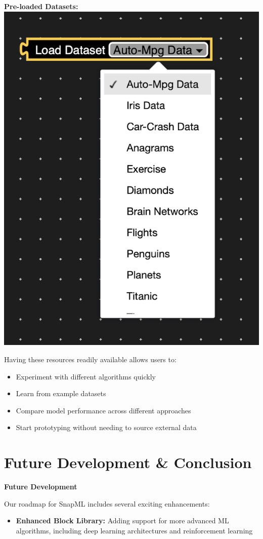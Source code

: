 \documentclass[a0paper,portrait]{article}
\newcommand{\compresslist}{%
\setlength{\itemsep}{0pt}%
\setlength{\parskip}{0pt}%
\setlength{\parsep}{0pt}%
}
\begin{document}
\begin{multicols}{2}
\begin{center}
\textbf{Pre-loaded Datasets:}
\includegraphics[width=0.7\linewidth]{目前已有的dataset.png}
\end{center}

Having these resources readily available allows users to:
\begin{itemize}\compresslist
    \item Experiment with different algorithms quickly
    \item Learn from example datasets
    \item Compare model performance across different approaches
    \item Start prototyping without needing to source external data
\end{itemize}

\section{Future Development \& Conclusion}

\textbf{Future Development}

Our roadmap for SnapML includes several exciting enhancements:

\begin{itemize}\compresslist
    \item \textbf{Enhanced Block Library:} Adding support for more advanced ML algorithms, including deep learning architectures and reinforcement learning
    

\end{itemize}
\end{multicols}
\end{document}

